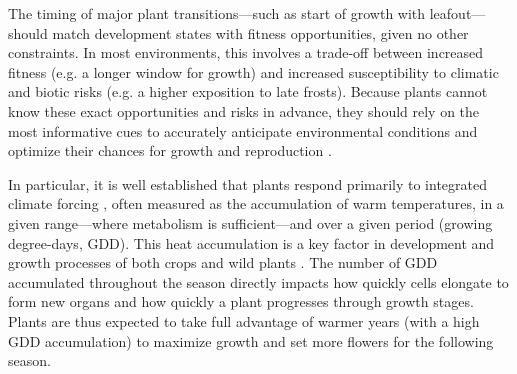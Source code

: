 \documentclass[11pt,letter]{article}
\begin{document}
The timing of major plant transitions---such as start of growth with leafout---should match development states with fitness opportunities, given no other constraints. In most environments, this involves a trade-off between increased fitness (e.g. a longer window for growth) and increased susceptibility to climatic and biotic risks (e.g. a higher exposition to late frosts). Because plants cannot know these exact opportunities and risks in advance, they should rely on the most informative cues to accurately anticipate environmental conditions and optimize their chances for growth and reproduction \citep{Chevin2015, Bonamour2019}.

In particular, it is well established that plants respond primarily to integrated climate forcing \citep{Chuine2017}, often measured as the accumulation of warm temperatures, in a given range---where metabolism is sufficient---and over a given period (growing degree-days, GDD). %
This heat accumulation is a key factor in development and growth processes of both crops \citep[e.g.][]{Cross1972} and wild plants \citep[e.g.][]{Hunter1992}. The number of GDD accumulated throughout the season directly impacts how quickly cells elongate to form new organs and how quickly a plant progresses through growth stages. Plants are thus expected to take full advantage of warmer years (with a high GDD accumulation) to maximize growth and set more flowers for the following season. %
\end{document}
